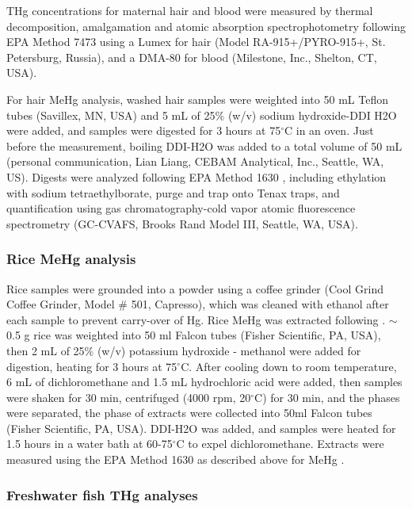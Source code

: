 THg concentrations for maternal hair and blood were measured by thermal decomposition, amalgamation and atomic absorption spectrophotometry following EPA Method 7473 \citep{usepa2007m7473} using a Lumex for hair (Model RA-915+/PYRO-915+, St. Petersburg, Russia), and a DMA-80 for blood (Milestone, Inc., Shelton, CT, USA).

For hair MeHg analysis, washed hair samples were weighted into 50 mL Teflon tubes (Savillex, MN, USA) and 5 mL of 25\% (w/v) sodium hydroxide-DDI H2O were added, and samples were digested for 3 hours at 75\({^\circ}\)C in an oven. Just before the measurement, boiling DDI-H2O was added to a total volume of 50 mL (personal communication, Lian Liang, CEBAM Analytical, Inc., Seattle, WA, US). Digests were analyzed following EPA Method 1630 \citep{usepa1630}, including ethylation with sodium tetraethylborate, purge and trap onto Tenax traps, and quantification using gas chromatography-cold vapor atomic fluorescence spectrometry (GC-CVAFS, Brooks Rand Model III, Seattle, WA, USA). 

\subsubsection{Rice MeHg analysis}

Rice samples were grounded into a powder using a coffee grinder (Cool Grind Coffee Grinder, Model \# 501, Capresso), which was cleaned with ethanol after each sample to prevent carry-over of Hg. Rice MeHg was extracted following \cite{liang1996simple}. \({\sim}\) 0.5 g rice was weighted into 50 ml Falcon tubes (Fisher Scientific, PA, USA), then 2 mL of 25\% (w/v) potassium hydroxide - methanol were added for digestion, heating for 3 hours at 75\({^\circ}\)C. After cooling down to room temperature, 6 mL of dichloromethane and 1.5 mL hydrochloric acid were added, then samples were shaken for 30 min, centrifuged  (4000 rpm, 20\({^\circ}\)C) for 30 min, and the phases were separated, the phase of extracts were collected into 50ml Falcon tubes (Fisher Scientific, PA, USA). DDI-H2O was added, and samples were heated for 1.5 hours in a water bath at 60-75\({^\circ}\)C to expel dichloromethane. Extracts were measured using the EPA Method 1630 as described above for MeHg \citep{usepa1630}.

\subsubsection{Freshwater fish THg analyses}


